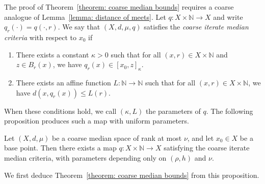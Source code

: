 \documentclass[12pt,reqno]{amsart}
\newcommand{\N}{\mathbb{N}}
\numberwithin{equation}{section}
\begin{document}
The proof of Theorem~\ref{theorem: coarse median bounds} requires a coarse analogue of Lemma~\ref{lemma: distance of meets}. Let $q:X\times\N\to X$ and write $q_r(\cdot)=q(\cdot,r)$. We say that $(X,d,\mu,q)$ satisfies the \textit{coarse iterate median criteria} with respect to $x_0$ if
\begin{enumerate}[label=(M\arabic*)]
    \item\label{property: m1} There exists a constant $\kappa>0$ such that for all $(x,r)\in X\times \N$ and $z\in B_r(x)$, we have $q_r(x)\in [x_0,z]_\kappa$.
    \item\label{property: m2} There exists an affine function $L:\N\to \N$ such that for all $(x,r)\in X\times \N$, we have $d(x,q_r(x))\le L(r)$.
\end{enumerate}
When these conditions hold, we call $(\kappa, L)$ the parameters of $q$. The following proposition produces such a map with uniform parameters.
\begin{proposition}\label{proposition: coarse meet existence}
    Let $(X,d,\mu)$ be a coarse median space of rank at most $\nu$, and let $x_0\in X$ be a base point. Then there exists a map $q: X\times \N\to X$ satisfying the coarse iterate median criteria, with parameters depending only on $(\rho,h)$ and $\nu$.
\end{proposition}
We first deduce Theorem~\ref{theorem: coarse median bounds} from this proposition.
\end{document}
